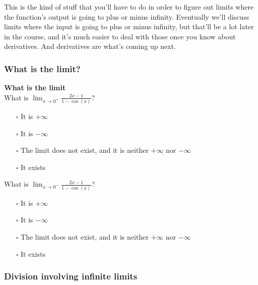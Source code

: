 \documentclass[pdftex, brazil, 12pt, twoside]{article}
\begin{document}
This is the kind of stuff that you'll
have to do in order to figure out limits
where the function's output is going
to plus or minus infinity.
Eventually we'll discuss limits where
the input is going to plus or minus infinity,
but that'll be a lot later in the course,
and it's much easier to deal with those
once you know about derivatives.
And derivatives are what's coming up next.

\subsubsection{What is the limit?}
\label{u0-lim-quo-what}

\begin{exercise}
  \textbf{What is the limit}\\
  What is $\displaystyle \lim_{x \to 0^+}\frac{2x-1}{1-\cos{(x)}}$?
  \begin{itemize}[noitemsep]
  \item[$\square$] It is $+\infty$
  \item[$\square$] It is $-\infty$
  \item[$\square$] The limit does not exist, and it is neither $+\infty$ nor $-\infty$
  \item[$\square$] It exists
  \end{itemize}

  What is $\displaystyle \lim_{x \to 0^-}\frac{2x-1}{1-\cos{(x)}}$?
  \begin{itemize}[noitemsep]
  \item[$\square$] It is $+\infty$
  \item[$\square$] It is $-\infty$
  \item[$\square$] The limit does not exist, and it is neither $+\infty$ nor $-\infty$
  \item[$\square$] It exists
  \end{itemize}
\end{exercise}

\subsubsection{Division involving infinite limits}
\label{u0-lim-quo-div-inf}
\end{document}
